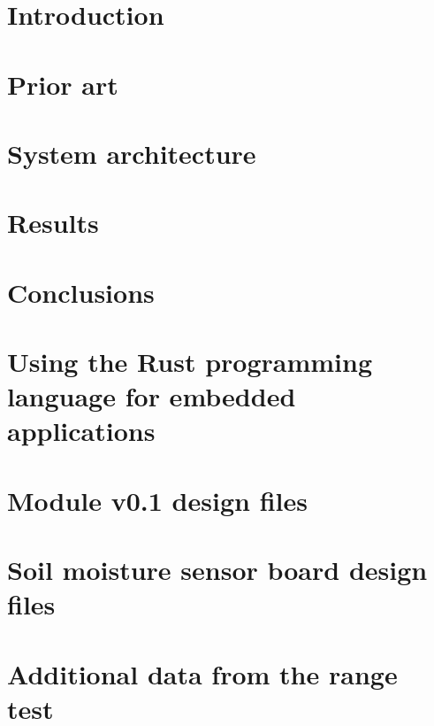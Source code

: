 \documentclass[twoside]{ctuthesis}
\begin{document}
\maketitle


\chapter{\label{chapter:introduction}Introduction}

\chapter{\label{chapter:prior}Prior art}

\chapter{\label{chapter:architecture}System architecture}

\chapter{\label{chapter:results}Results}

\chapter{Conclusions}

\printindex

\begin{appendices}
\chapter{\label{chapter:rust}Using the Rust programming language for embedded applications}

\chapter{\label{chapter:module01-files}Module v0.1 design files}

\chapter{\label{chapter:sensor-files}Soil moisture sensor board design files}

\chapter{\label{chapter:more-range-test}Additional data from the range test}

\end{appendices}



\end{document}

